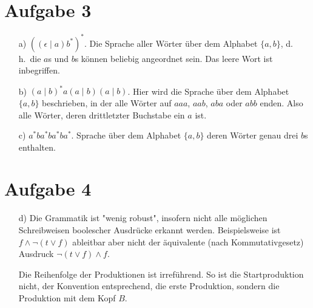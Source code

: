 \documentclass[11pt,a4paper,ngerman]{article}
\renewcommand\dh{d.\,h.\ }
\begin{document}
\section*{Aufgabe 3}
\begin{itemize}
	\item[a)] $\left((\epsilon\mid a)b^*\right)^*$. Die Sprache aller Wörter über dem Alphabet $\{a,b\}$, \dh die $a$s und $b$s können beliebig angeordnet sein. Das leere Wort ist inbegriffen.
	
	\item[b)] $(a\mid b)^* a(a\mid b)(a\mid b)$.  Hier wird die Sprache über dem Alphabet $\{a,b\}$ beschrieben, in der alle Wörter auf $aaa$, $aab$, $aba$ oder $abb$ enden. Also alle Wörter, deren drittletzter Buchstabe ein $a$ ist.
	
	\item[c)] $a^* ba^* ba^* ba^*$. Sprache über dem Alphabet $\{a,b\}$ deren Wörter genau drei $b$s enthalten.
\end{itemize}

\section*{Aufgabe 4}
\begin{itemize}
	\item[d)] Die Grammatik ist "wenig robust", insofern nicht alle möglichen Schreibweisen boolescher Ausdrücke erkannt werden. Beispielsweise ist $f \wedge \neg (t \vee f)$ ableitbar aber nicht der äquivalente (nach Kommutativgesetz) Ausdruck $\neg (t \vee f) \wedge f$.
	
	Die Reihenfolge der Produktionen ist irreführend. So ist die Startproduktion nicht, der Konvention entsprechend, die erste Produktion, sondern die Produktion mit dem Kopf $B$.
\end{itemize}
\end{document}

